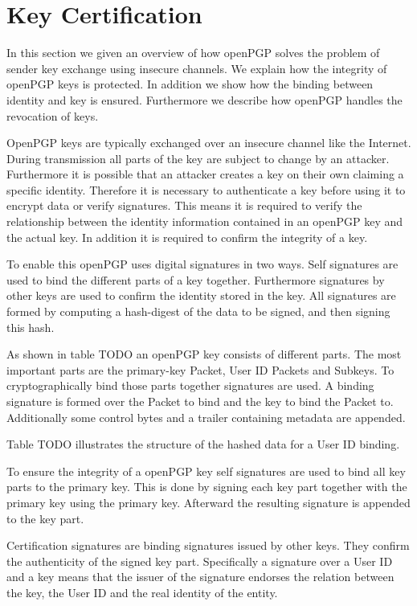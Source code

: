 \section{Key Certification}

In this section we given an overview of how openPGP solves the problem of sender key exchange using insecure channels. We explain how the integrity of openPGP keys is protected. In addition we show how the binding between identity and key is ensured. Furthermore we describe how openPGP handles the revocation of keys.

OpenPGP keys are typically exchanged over an insecure channel like the Internet. During transmission all parts of the key are subject to change by an attacker. Furthermore it is possible that an attacker creates a key on their own claiming a specific identity. Therefore it is necessary to authenticate a key before using it to encrypt data or verify signatures.
This means it is required to verify the relationship between the identity information contained in an openPGP key and the actual key. In addition it is required to confirm the integrity of a key.

To enable this openPGP uses digital signatures in two ways. Self signatures are used to bind the different parts of a key together. Furthermore signatures by other keys are used to confirm the identity stored in the key. All signatures are formed by computing a hash-digest of the data to be signed, and then signing this hash.

As shown in table TODO an openPGP key consists of different parts. The most important parts are the primary-key Packet, User ID Packets and Subkeys. To cryptographically bind those parts together signatures are used. A binding signature is formed over the Packet to bind and the key to bind the Packet to. Additionally some control bytes and a trailer containing metadata are appended. 

Table TODO illustrates the structure of the hashed data for a User ID binding.


To ensure the integrity of a openPGP key self signatures are used to bind all key parts to the primary key. This is done by signing each key part together with the primary key using the primary key. Afterward the resulting signature is appended to the key part.

Certification signatures are binding signatures issued by other keys. They confirm the authenticity of the signed key part. Specifically a signature over a User ID and a key means that the issuer of the signature endorses the relation between the key, the User ID and the real identity of the entity.

